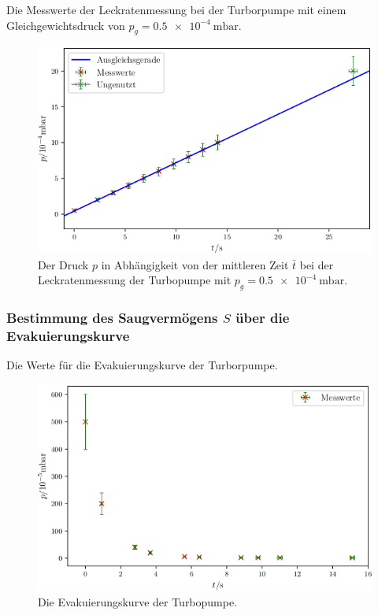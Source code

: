 \begin{table}
\centering
\caption{Die Messwerte der Leckratenmessung bei der Turborpumpe mit einem Gleichgewichtsdruck von $p_g = \SI{0.5e-4}{\milli\bar}$.}

\label{tab:TL4}
\end{table}

\begin{figure}
\centering
\includegraphics[width=\linewidth-70pt,height=\textheight-70pt,keepaspectratio]{content/images/TL4.png}
\caption{Der Druck $p$ in Abhängigkeit von der mittleren Zeit $\bar{t}$ bei der Leckratenmessung der Turbopumpe  mit $p_g = \SI{0.5e-4}{\milli\bar}$.}
\label{fig:TL4}
\end{figure}

\subsubsection{Bestimmung des Saugvermögens $S$ über die Evakuierungskurve}

\begin{table}
\centering
\caption{Die Werte für die Evakuierungskurve der Turborpumpe.}

\label{tab:TS}
\end{table}

\begin{figure}
\centering
\includegraphics[width=\linewidth-70pt,height=\textheight-70pt,keepaspectratio]{content/images/TSE.png}
\caption{Die Evakuierungskurve der Turbopumpe.}
\label{fig:TSE}
\end{figure}

